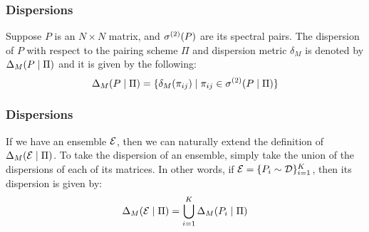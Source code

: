 \begin{frame} \frametitle{Dispersions}

\begin{alertblock}{}
Suppose $P$ is an $N \times N$ matrix, and ${\sigma^{(2)}}(P)$ are its spectral pairs.
The dispersion of $P$ with respect to the pairing scheme $\Pi$ and dispersion metric $\delta_M$ is denoted by $\Delta_M(P \mid \Pi)$ and it is given by the following:
$$\Delta_M(P \mid \Pi) = \{\delta_M({\pi_{ij}}) \mid {\pi_{ij}} \in {\sigma^{(2)}}(P \mid \Pi)\}$$
\end{alertblock}

\end{frame}

\begin{frame} \frametitle{Dispersions}

\begin{alertblock}{}
If we have an ensemble $\mathcal{E}$, then we can naturally extend the definition of $\Delta_M(\mathcal{E} \mid \Pi)$.
To take the dispersion of an ensemble, simply take the union of the dispersions of each of its matrices.
In other words, if $\mathcal{E} = \{P_i \sim \mathcal{D}\}_{i = 1}^K$, then its dispersion is given by:
$$\Delta_M(\mathcal{E} \mid \Pi) = \bigcup_{i=1}^K \Delta_M(P_i \mid \Pi)$$
\end{alertblock}

\end{frame}






%
%




